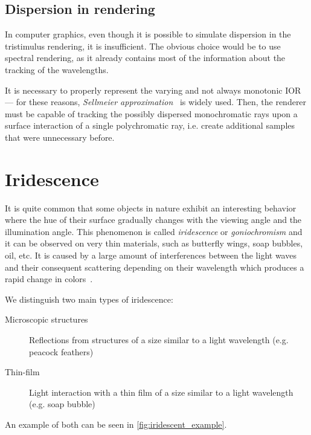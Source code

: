 \subsection{Dispersion in rendering}
In computer graphics, even though it is possible to simulate dispersion in the tristimulus rendering, it is insufficient. The obvious choice would be to use spectral rendering, as it already contains most of the information about the tracking of the wavelengths. 

It is necessary to properly represent the varying and not always monotonic IOR --- for these reasons, \emph{Sellmeier approximation}~\cite{wilkie2002tone} is widely used. Then, the renderer must be capable of tracking the possibly dispersed monochromatic rays upon a surface interaction of a single polychromatic ray, i.e. create additional samples that were unnecessary before.

\section{Iridescence}
\label{sec:irid}

It is quite common that some objects in nature exhibit an interesting behavior where the hue of their surface gradually changes with the viewing angle and the illumination angle. This phenomenon is called \emph{iridescence} or \emph{goniochromism} and it can be observed on very thin materials, such as butterfly wings, soap bubbles, oil, etc. It is caused by a large amount of interferences between the light waves and their consequent scattering depending on their wavelength which produces a rapid change in colors~\cite{belcour2017practical}.

We distinguish two main types of iridescence:

\begin{description}
	\item[Microscopic structures] Reflections from structures of a size similar to a light wavelength (e.g. peacock feathers)
	\item[Thin-film] Light interaction with a thin film of a size similar to a light wavelength (e.g. soap bubble)
\end{description}

An example of both can be seen in \autoref{fig:iridescent_example}.

